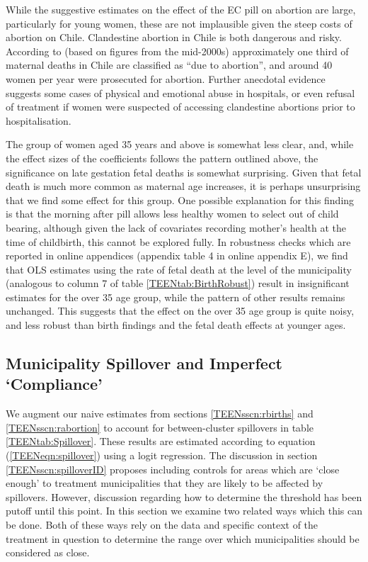 While the suggestive estimates on the effect of the EC pill on abortion are 
large, particularly for young women, these are not implausible given the steep 
costs of abortion on Chile.  Clandestine abortion in Chile is both dangerous and
risky.  According to \citet{ShepardCasas2007} (based on figures from the 
mid-2000s) approximately one third of maternal deaths in Chile are classified as 
``due to abortion'', and around 40 women per year were prosecuted for abortion.
Further anecdotal evidence suggests some cases of physical and emotional abuse 
in hospitals, or even refusal of treatment if women were suspected of accessing 
clandestine abortions prior to hospitalisation.

The group of women aged 35 years and above is somewhat less clear, and, while the 
effect sizes of the coefficients follows the pattern outlined above, the
significance on late gestation fetal deaths is somewhat surprising.  Given that
fetal death is much more common as maternal age increases, it is perhaps 
unsurprising that we find some effect for this group.  One possible explanation
for this finding is that the morning after pill allows less healthy women to 
select out of child bearing, although given the lack of covariates recording 
mother's health at the time of childbirth, this cannot be explored fully.  In
robustness checks which are reported in online appendices (appendix table 4 in
online appendix E), we find that OLS estimates using the rate of fetal death at 
the level of the municipality (analogous to column 7 of table 
\ref{TEENtab:BirthRobust}) result in insignificant estimates for the over 35 age 
group, while the pattern of other results remains unchanged. This suggests that 
the effect on the over 35 age group is quite noisy, and less robust than birth 
findings and the fetal death effects at younger ages.

\subsection{Municipality Spillover and Imperfect `Compliance'}
\label{TEENsscn:spillover}
We augment our naive estimates from sections \ref{TEENsscn:rbirths} and
\ref{TEENsscn:rabortion} to account for between-cluster spillovers in table
\ref{TEENtab:Spillover}.  These results are estimated according to equation
(\ref{TEENeqn:spillover}) using a logit regression.  The discussion in section
\ref{TEENsscn:spilloverID} proposes including controls for areas which are `close 
enough' to treatment municipalities that they are likely to be affected by
spillovers.  However, discussion regarding how to determine the threshold has
been putoff until this point. In this section we examine two related ways which 
this can be done.  Both of these ways rely on the data and specific context 
of the treatment in question to determine the range over which municipalities 
should be considered as close.


